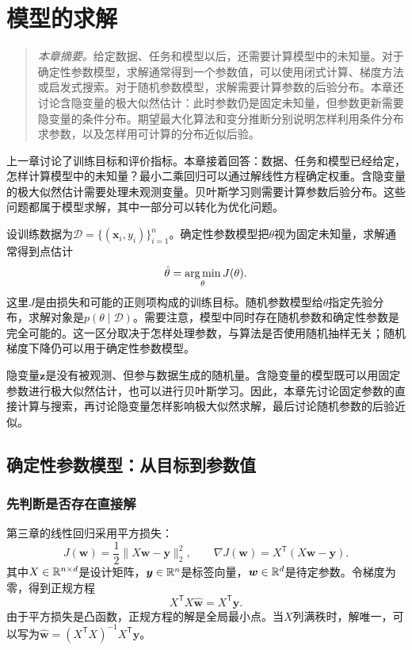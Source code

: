 \chapter{模型的求解}
\label{chap:model-solving}

\begin{quote}\small
\textit{本章摘要。}给定数据、任务和模型以后，还需要计算模型中的未知量。对于确定性参数模型，求解通常得到一个参数值，可以使用闭式计算、梯度方法或启发式搜索。对于随机参数模型，求解需要计算参数的后验分布。本章还讨论含隐变量的极大似然估计：此时参数仍是固定未知量，但参数更新需要隐变量的条件分布。期望最大化算法和变分推断分别说明怎样利用条件分布求参数，以及怎样用可计算的分布近似后验。
\end{quote}

上一章讨论了训练目标和评价指标。本章接着回答：数据、任务和模型已经给定，怎样计算模型中的未知量？最小二乘回归可以通过解线性方程确定权重。含隐变量的极大似然估计需要处理未观测变量。贝叶斯学习则需要计算参数后验分布。这些问题都属于模型求解，其中一部分可以转化为优化问题。

设训练数据为$\mathcal D=\{(\bm x_i,y_i)\}_{i=1}^n$。确定性参数模型把$\theta$视为固定未知量，求解通常得到点估计
\begin{equation}
 \hat\theta=\mathop{\mathrm{arg\,min}}_\theta J(\theta).
 \label{eq:solving-deterministic-objective}
\end{equation}
这里$J$是由损失和可能的正则项构成的训练目标。随机参数模型给$\theta$指定先验分布，求解对象是$p(\theta\mid\mathcal D)$。需要注意，模型中同时存在随机参数和确定性参数是完全可能的。这一区分取决于怎样处理参数，与算法是否使用随机抽样无关；随机梯度下降仍可以用于确定性参数模型。

隐变量$\bm z$是没有被观测、但参与数据生成的随机量。含隐变量的模型既可以用固定参数进行极大似然估计，也可以进行贝叶斯学习。因此，本章先讨论固定参数的直接计算与搜索，再讨论隐变量怎样影响极大似然求解，最后讨论随机参数的后验近似。

\section{确定性参数模型：从目标到参数值}

\subsection{先判断是否存在直接解}
第三章的线性回归采用平方损失：
\begin{equation}
 J(\bm w)=\frac12\|X\bm w-\bm y\|_2^2,
 \qquad \nabla J(\bm w)=X^{\mathsf T}(X\bm w-\bm y).
 \label{eq:solving-least-squares}
\end{equation}
其中$X\in\mathbb{R}^{n\times d}$是设计矩阵，$\bm y\in\mathbb{R}^n$是标签向量，$\bm w\in\mathbb{R}^d$是待定参数。令梯度为零，得到正规方程
\begin{equation}
 X^{\mathsf T}X\hat{\bm w}=X^{\mathsf T}\bm y.
 \label{eq:solving-normal-equation}
\end{equation}
由于平方损失是凸函数，正规方程的解是全局最小点。当$X$列满秩时，解唯一，可以写为$\hat{\bm w}=(X^{\mathsf T}X)^{-1}X^{\mathsf T}\bm y$。

